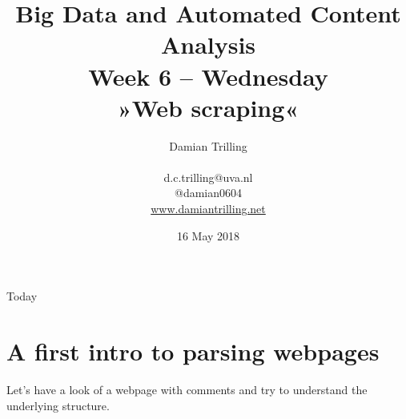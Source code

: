\documentclass{beamer}
\begin{document}
\title[Big Data  and Automated Content Analysis]{\textbf{Big Data  and Automated Content Analysis} \\ Week 6 -- Wednesday\\ »Web scraping«}
\author[Damian Trilling]{Damian Trilling \\ ~ \\ \footnotesize{d.c.trilling@uva.nl \\@damian0604} \\ \url{www.damiantrilling.net}}
\date{16 May 2018}

\begin{frame}{}
\titlepage
\end{frame}

\begin{frame}{Today}
\tableofcontents
\end{frame}



\section{A first intro to parsing webpages}

\begin{frame}
Let's have a look of a webpage with comments and try to understand the underlying structure.
\end{frame}
\end{document}
